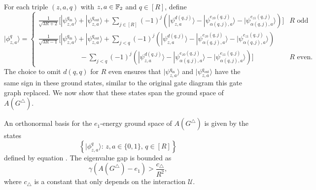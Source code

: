 \documentclass[../thesis-main/thesis-main]{subfiles}
\begin{document}
For each triple $(z,a,q)$ with $z,a\in\mathbb{F}_2$ and $q\in[R]$, define
\begin{equation}
  |\phi_{z,a}^{q}\rangle=\begin{cases}
    \frac{1}{\sqrt{3R+2}}\Big[|\psi_{z,a}^{q_{\mathrm{in}}}\rangle+|\psi_{z,a}^{q_{\mathrm{out}}}\rangle+\sum_{j\in[R]}(-1)^j \left(|\psi_{z,a}^{d(q,j)}\rangle-|\psi_{\alpha(q,j),a}^{e_{z0}(q,j)}\rangle-|\psi_{\alpha(q,j),a}^{e_{z1}(q,j)}\rangle\right)\Big] & R\text{ odd}\\
    \frac{1}{\sqrt{3R-1}}\Big[|\psi_{z,a}^{q_{\mathrm{in}}}\rangle+|\psi_{z,a}^{q_{\mathrm{out}}}\rangle+\sum_{j<q}(-1)^j \left(|\psi_{z,a}^{d(q,j)}\rangle-|\psi_{\alpha(q,j),a}^{e_{z0}(q,j)}\rangle-|\psi_{\alpha(q,j),a}^{e_{z1}(q,j)}\rangle\right)\\
       \qquad \qquad \qquad-\sum_{j<q}(-1)^j \left(|\psi_{z,a}^{d(q,j)}\rangle-|\psi_{\alpha(q,j),a}^{e_{z0}(q,j)}\rangle-|\psi_{\alpha(q,j),a}^{e_{z1}(q,j)}\rangle\right)\Big]& R\text{ even.}
  \end{cases}
  \label{eq:phi_z_a_q}
\end{equation}
The choice to omit $d(q,q)$ for $R$ even ensures that $|\psi^{q_{\text{in}}}_{z,a}\rangle$ and $|\psi^{q_{\text{out}}}_{z,a}\rangle$ have the same sign in these ground states, similar to the original gate diagram this gate graph replaced.  We now show that these states span the ground space of $A(G^{\triangle})$.
\begin{lemma}
\label{lem:A(G_triangle)}
An orthonormal basis for the $e_{1}$-energy ground space of $A(G^{\triangle})$ is given by the states
\begin{equation}
  \left\{ |\phi_{z,a}^{q}\rangle:\, z,a\in\{0,1\},\, q\in[R]\right\} 
\end{equation}
defined by equation . The eigenvalue gap is bounded as 
\begin{equation}
  \gamma(A(G^{\triangle})-e_{1}) > \frac{c_{\triangle}}{R^{2}},
\label{eq:G^triangle_lower_bnd}
\end{equation}
where $c_{\triangle}$ is a constant that only depends on the interaction $\mathcal{U}$.
\end{lemma}
\end{document}
